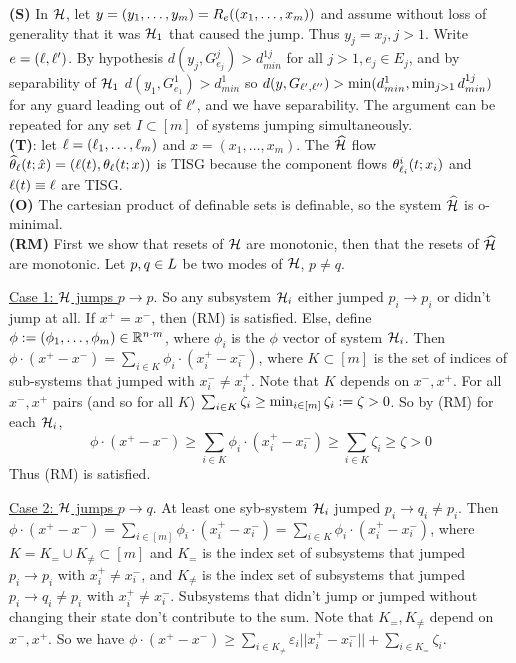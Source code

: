 \begin{prf}
\textbf{(S)} In $\mathcal{H}$, let $y=(y_1,\ldots,y_m)=R_e((x_1,\ldots,x_m))$ and assume without loss of generality that it was $\mathcal{H}_1$ that caused the jump.
Thus $y_j=x_j,j >1$.
Write $e=(\ell,\ell ')$.
By hypothesis $d(y_j,G^j_{e_j})>d_{min}^{1j}$ for all $j>1,e_j\in E_j$, 
and by separability of $\mathcal{H}_1$ $d(y_1,G^1_{e_1}) > d_{min}^1$ so $d(y,G_{\ell', \ell ''}) > \min (d_{min}^1, \min_{j>1}d_{min}^{1j}) $ for any guard leading out of $\ell'$, and we have separability.
The argument can be repeated for any set $I \subset [m]$ of systems jumping simultaneously.
\\
\textbf{(T)}: let $\ell = (\ell_1,\ldots,\ell_m)$ and $x = (x_1,\ldots,x_m)$.
The $\widehat{\mathcal{H}}$ flow $\widehat{\theta}_\ell(t;\hat{x}) = (\ell(t),\theta_\ell(t;x))$ is TISG because the component flows $\theta^i_{\ell_i}(t;x_i)$ and $\ell(t) \equiv \ell$ are TISG.
\\
\textbf{(O)} The cartesian product of definable sets is definable, so the system $\widehat{\mathcal{H}}$ is o-minimal.
\\
\textbf{(RM)} First we show that resets of $\mathcal{H}$ are monotonic, then that the resets of $\widehat{\mathcal{H}}$ are monotonic.
Let $p,q \in L$ be two modes of $\mathcal{H}$, $p\neq q$.

\underline{Case 1: $\mathcal{H}$ jumps $p \rightarrow p$}.
So any subsystem $\mathcal{H}_i$ either jumped $p_i \rightarrow p_i$ or didn't jump at all.
If $x^+ = x^-$, then (RM) is satisfied.
Else, define $\phi := (\phi_1,\ldots,\phi_m) \in \mathbb{R}^{n\cdot m}$, where $\phi_i$ is the $\phi$ vector of system $\mathcal{H}_i$.
Then $\phi \cdot (x^+ - x^-) = \sum_{i\in K}\phi_i\cdot(x_i^+ - x_i^-)$, 
where $K \subset [m]$ is the set of indices of sub-systems that jumped with $x_i^- \neq x_i^+$.
Note that $K$ depends on $x^-,x^+$.
%
For all $x^-,x^+$ pairs (and so for all $K$) 
$\sum_{i\in K} \zeta_i \geq \min_{i \in [m]}\zeta_i := \zeta > 0$.
So by (RM) for each $\mathcal{H}_i$,
\begin{equation*}
\label{eq:parallel rm1}
\phi \cdot (x^+ - x^-)\geq  \sum_{i\in K}\phi_i\cdot(x_i^+ - x_i^-) \geq \sum_{i\in K}\zeta_i \geq \zeta > 0
\end{equation*}
Thus (RM) is satisfied.

\underline{Case 2: $\mathcal{H}$ jumps $p \rightarrow q$}.
At least one syb-system $\mathcal{H}_i$ jumped $p_i \rightarrow q_i \neq p_i$.
Then 
$\phi \cdot (x^+ - x^-) = \sum_{i\in [m]}\phi_i\cdot(x_i^+ - x_i^-) = \sum_{i\in K}\phi_i\cdot(x_i^+ - x_i^-)$,
where $K = K_= \cup K_{\neq} \subset [m]$ and 
$K_=$ is the index set of subsystems that jumped $p_i \rightarrow p_i$ with $x_i^+ \neq x_i^-$, 
and $K_{\neq}$ is the index set of subsystems that jumped $p_i \rightarrow q_i \neq p_i$ with $x_i^+ \neq x_i^-$.
Subsystems that didn't jump or jumped without changing their state don't contribute to the sum.
Note that $K_=,K_{\neq}$ depend on $x^-,x^+$.
So we have
$\phi \cdot (x^+ - x^-) \geq \sum_{i\in K_{\neq}}\varepsilon_i ||x_i^+-x_i^-|| + \sum_{i\in K_=} \zeta_i$.


\end{prf}
